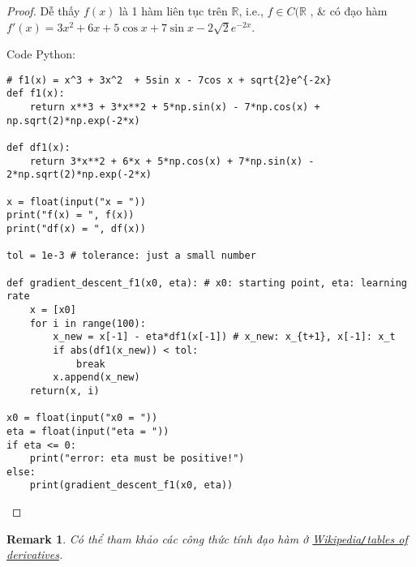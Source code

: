 \documentclass{article}
\newtheorem{remark}{Remark}
\begin{document}
\begin{proof}
	Dễ thấy $f(x)$ là 1 hàm liên tục trên $\mathbb{R}$, i.e., $f\in C(\mathbb{R}$ , \& có đạo hàm $f'(x) = 3x^2 + 6x + 5\cos x + 7\sin x - 2\sqrt{2}e^{-2x}$.
	
	Code Python:
	\begin{verbatim}
# f1(x) = x^3 + 3x^2  + 5sin x - 7cos x + sqrt{2}e^{-2x}
def f1(x):
    return x**3 + 3*x**2 + 5*np.sin(x) - 7*np.cos(x) + np.sqrt(2)*np.exp(-2*x)

def df1(x):
    return 3*x**2 + 6*x + 5*np.cos(x) + 7*np.sin(x) - 2*np.sqrt(2)*np.exp(-2*x)

x = float(input("x = "))
print("f(x) = ", f(x))
print("df(x) = ", df(x))

tol = 1e-3 # tolerance: just a small number

def gradient_descent_f1(x0, eta): # x0: starting point, eta: learning rate
    x = [x0]
    for i in range(100):
        x_new = x[-1] - eta*df1(x[-1]) # x_new: x_{t+1}, x[-1]: x_t
        if abs(df1(x_new)) < tol:
            break
        x.append(x_new)
    return(x, i)

x0 = float(input("x0 = "))
eta = float(input("eta = "))
if eta <= 0:
    print("error: eta must be positive!")
else:
    print(gradient_descent_f1(x0, eta))
	\end{verbatim}
\end{proof}

\begin{remark}
	Có thể tham khảo các công thức tính đạo hàm ở \href{https://en.wikibooks.org/wiki/Calculus/Tables_of_Derivatives}{Wikipedia{\tt/}tables of derivatives}.
\end{remark}
\end{document}
